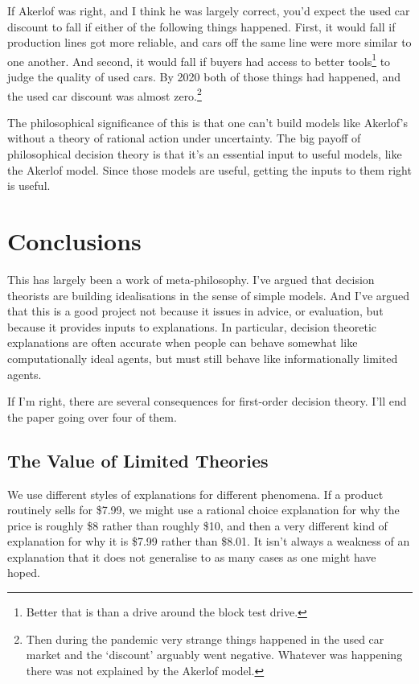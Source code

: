 \documentclass[
  11pt,
  letterpaper,
  DIV=11,
  numbers=noendperiod,
  twoside]{scrartcl}
\begin{document}
If Akerlof was right, and I think he was largely correct, you'd expect
the used car discount to fall if either of the following things
happened. First, it would fall if production lines got more reliable,
and cars off the same line were more similar to one another. And second,
it would fall if buyers had access to better tools\footnote{Better that
  is than a drive around the block test drive.} to judge the quality of
used cars. By 2020 both of those things had happened, and the used car
discount was almost zero.\footnote{Then during the pandemic very strange
  things happened in the used car market and the `discount' arguably
  went negative. Whatever was happening there was not explained by the
  Akerlof model.}

The philosophical significance of this is that one can't build models
like Akerlof's without a theory of rational action under uncertainty.
The big payoff of philosophical decision theory is that it's an
essential input to useful models, like the Akerlof model. Since those
models are useful, getting the inputs to them right is useful.

\section{Conclusions}\label{conclusions}

This has largely been a work of meta-philosophy. I've argued that
decision theorists are building idealisations in the sense of simple
models. And I've argued that this is a good project not because it
issues in advice, or evaluation, but because it provides inputs to
explanations. In particular, decision theoretic explanations are often
accurate when people can behave somewhat like computationally ideal
agents, but must still behave like informationally limited agents.

If I'm right, there are several consequences for first-order decision
theory. I'll end the paper going over four of them.

\subsection{The Value of Limited
Theories}\label{the-value-of-limited-theories}

We use different styles of explanations for different phenomena. If a
product routinely sells for \$7.99, we might use a rational choice
explanation for why the price is roughly \$8 rather than roughly \$10,
and then a very different kind of explanation for why it is \$7.99
rather than \$8.01. It isn't always a weakness of an explanation that it
does not generalise to as many cases as one might have hoped.
\end{document}
